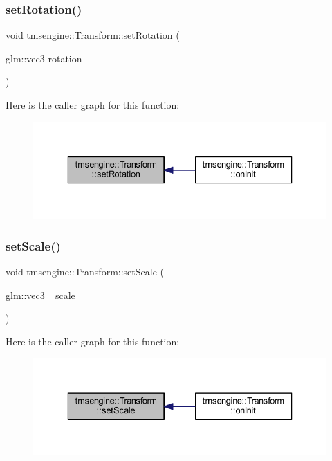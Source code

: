 \subsubsection{\texorpdfstring{set\+Rotation()}{setRotation()}}
{\footnotesize\ttfamily void tmsengine\+::\+Transform\+::set\+Rotation (\begin{DoxyParamCaption}\item[{glm\+::vec3}]{rotation }\end{DoxyParamCaption})}

Here is the caller graph for this function\+:\nopagebreak
\begin{figure}[H]
\begin{center}
\leavevmode
\includegraphics[width=336pt]{classtmsengine_1_1_transform_a64a3902ef95913ce9cdcc586060e8478_icgraph}
\end{center}
\end{figure}
\mbox{\label{classtmsengine_1_1_transform_ae70b645863286dd4ef06b2ff3dc93db9}} 
\subsubsection{\texorpdfstring{set\+Scale()}{setScale()}}
{\footnotesize\ttfamily void tmsengine\+::\+Transform\+::set\+Scale (\begin{DoxyParamCaption}\item[{glm\+::vec3}]{\+\_\+scale }\end{DoxyParamCaption})}

Here is the caller graph for this function\+:\nopagebreak
\begin{figure}[H]
\begin{center}
\leavevmode
\includegraphics[width=336pt]{classtmsengine_1_1_transform_ae70b645863286dd4ef06b2ff3dc93db9_icgraph}
\end{center}
\end{figure}
\mbox{\label{classtmsengine_1_1_transform_a9b5c3f77a33d065a7c35c3f125f411c9}} 
